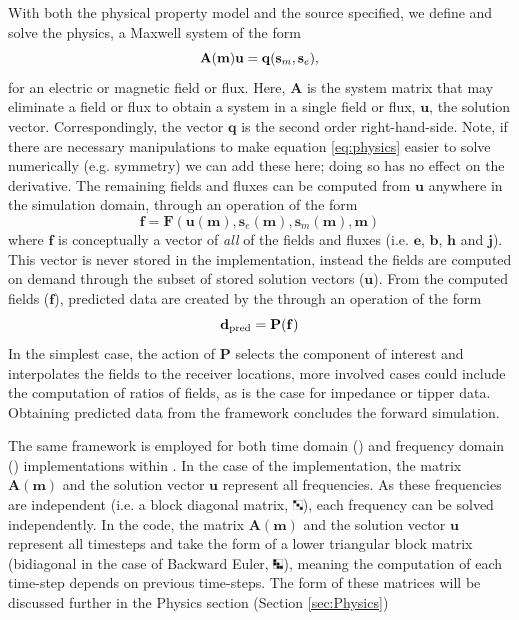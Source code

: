 With both the physical property model and the source specified, we define and
solve the physics, a Maxwell system of the form
\begin{equation}
\mathbf{A}(\mathbf{m})\mathbf{u} = \mathbf{q}(\mathbf{s}_m,\mathbf{s}_e),
    \label{eq:physics}
\end{equation}
for an electric or magnetic field or flux. Here, $\mathbf{A}$ is the system
matrix that may eliminate a field or flux to obtain a system in a single field
or flux, $\mathbf{u}$, the solution vector.  Correspondingly, the vector
$\mathbf{q}$ is the second order right-hand-side. Note, if there are necessary
manipulations to make equation \ref{eq:physics} easier to solve numerically
(e.g. symmetry) we can add these here; doing so has no effect on the
derivative. The remaining fields and fluxes can be computed from $\mathbf{u}$
anywhere in the simulation domain, through an operation of the form
\begin{equation}
    \mathbf{f} = \mathbf{F}(\mathbf{u(m)}, \mathbf{s}_e(\mathbf{m}), \mathbf{s}_m(\mathbf{m}), \mathbf{m})
\label{eq:fields}
\end{equation}
where $\mathbf{f}$ is conceptually a vector of \emph{all} of the fields and
fluxes (i.e. $\mathbf{e}$, $\mathbf{b}$, $\mathbf{h}$ and $\mathbf{j}$). This
vector is never stored in the implementation, instead the fields are computed
on demand through the subset of stored solution vectors ($\mathbf{u}$). From the
computed fields ($\mathbf{f}$), predicted data are created by the \Receivers
through an operation of the form
\begin{equation}
    \mathbf{d}_\text{pred} = \mathbf{P}(\mathbf{f})
\label{eq:data}
\end{equation}
In the simplest case, the action of $\mathbf{P}$ selects the component of interest
and interpolates the fields to the receiver locations, more involved cases
could include the computation of ratios of fields, as is the case for
impedance or tipper data. Obtaining predicted data from the framework
concludes the forward simulation.

The same framework is employed for both time domain (\TDEM) and frequency
domain (\FDEM) implementations within \simpegEM. In the case of the \FDEM
implementation, the matrix $\mathbf{A}(\mathbf{m})$ and the solution vector
$\mathbf{u}$ represent all frequencies. As these frequencies are independent
(i.e. a block diagonal matrix,
\includegraphics[width=0.02\textwidth]{images/blkdiag}),  each frequency can
be solved independently. In the \TDEM code, the matrix
$\mathbf{A}(\mathbf{m})$ and the solution vector $\mathbf{u}$ represent all
timesteps \citep{Oldenburg2013, Haber2014a} and take the form of a  lower
triangular block matrix (bidiagonal in the case of Backward Euler,
\includegraphics[width=0.02\textwidth]{images/blksubdiag}),  meaning the
computation of each time-step depends on previous time-steps. The form of
these matrices will be discussed further in the Physics section (Section \ref{sec:Physics})

